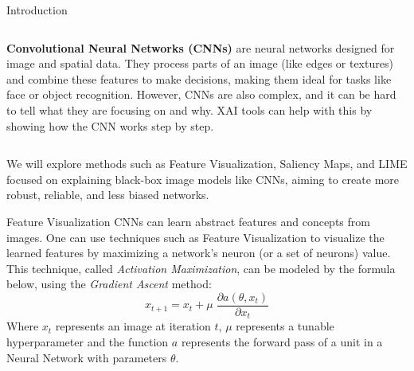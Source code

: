 \documentclass[final]{beamer}
\newlength{\colwidth}
\begin{document}
\begin{frame}[t]
\begin{columns}[t]
\begin{column}{\colwidth}
\begin{block}{Introduction}
\begin{columns}
      \begin{column}{0.4\textwidth}        
        
        \textbf{Convolutional Neural Networks (CNNs)} are neural networks designed for image and spatial data. They process parts of an image (like edges or textures) and combine these features to make decisions, making them ideal for tasks like face or object recognition.
        However, CNNs are also complex, and it can be hard to tell what they are focusing on and why. 
        XAI tools can help with this by showing how the CNN works step by step.
      \end{column}
    
    \end{columns}
    We will explore methods such as Feature Visualization, Saliency Maps, and LIME focused on explaining black-box image models like CNNs, aiming to create more robust, reliable, and less biased networks.
  \end{block}

  \begin{block}{Feature Visualization}
    CNNs can learn abstract features and concepts from images. 
    One can use techniques such as Feature Visualization to visualize the learned features by maximizing a network's neuron (or a set of neurons) value.
    This technique, called \emph{Activation Maximization}, can be modeled by the formula below, using the \emph{Gradient Ascent} method:
    \[x_{t + 1} = x_{t} + \mu \;\frac{\partial a(\theta, x_t)}{\partial x_t}\]
    Where \(x_t\) represents an image at iteration \(t\), \(\mu\) represents a tunable hyperparameter and the function \(a\) represents the forward pass of a unit in a Neural Network with parameters \(\theta\).
    

\end{block}
\end{column}
\end{columns}
\end{frame}
\end{document}
